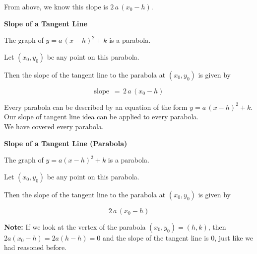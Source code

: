 \documentclass{ximera}
\begin{document}
From above, we know this slope is \textbf{$2 \, a \, (x_0 - h)$}.






\begin{conclusion} \textbf{\textcolor{green!50!black}{Slope of a Tangent Line}} 


The graph of $y = a \, (x - h)^2 + k$ is a parabola.

Let $(x_0, y_0)$ be any point on this parabola.

Then the slope of the tangent line to the parabola at $(x_0, y_0)$ is given by 



\[ \text{slope } \, = \, 2 \, a \, (x_0 - h)  \]


\end{conclusion}


Every parabola can be described by an equation of the form $y = a \, (x - h)^2 + k$. \\

Our slope of tangent line idea can be applied to every parabola. \\

We have covered every parabola. \\














\begin{theorem} \textbf{\textcolor{green!50!black}{Slope of a Tangent Line (Parabola)}} 


The graph of $y = a (x - h)^2 + k$ is a parabola.

Let $(x_0, y_0)$ be any point on this parabola.

Then the slope of the tangent line to the parabola at $(x_0, y_0)$ is given by 



\[ 2 \, a \, (x_0 - h) \]


\end{theorem}












\textbf{Note:} If we look at the vertex of the parabola $(x_0, y_0) = (h, k)$, then $2 a (x_0 - h) = 2 a (h - h) = 0$ and the slope of the tangent line is $0$, just like we had reasoned before. \\
\end{document}
